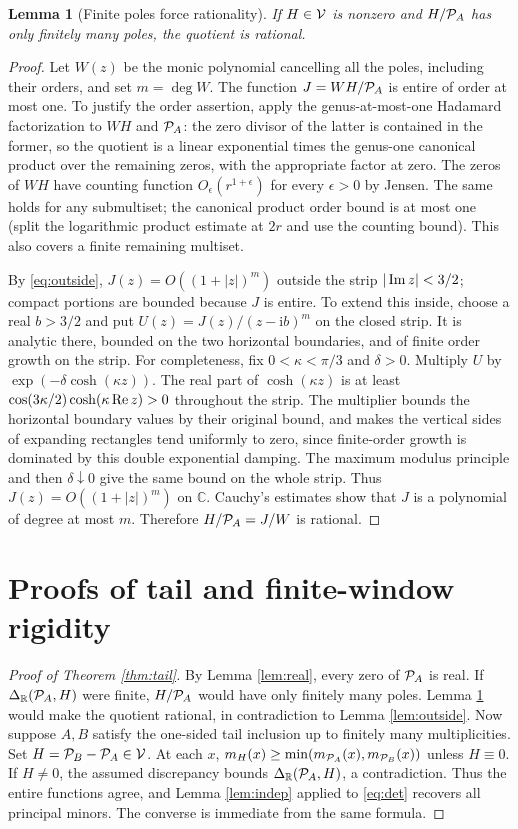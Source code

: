 \documentclass[11pt]{article}
\newtheorem{lemma}[theorem]{Lemma}
\theoremstyle{definition}\newtheorem{definition}[theorem]{Definition}
\newcommand{\C}{\mathbb C}\newcommand{\R}{\mathbb R}\newcommand{\N}{\mathbb N}
\newcommand{\ii}{\mathrm i}\newcommand{\diag}{\operatorname{diag}}
\begin{document}
\begin{lemma}[Finite poles force rationality]\label{lem:rational}
If $H\in\mathcal V$ is nonzero and $H/\mathcal P_A$ has only finitely many poles, the quotient is rational.
\end{lemma}
\begin{proof}
Let $W(z)$ be the monic polynomial cancelling all the poles, including their orders, and set $m=\deg W$. The function $J=W H/\mathcal P_A$ is entire of order at most one. To justify the order assertion, apply the genus-at-most-one Hadamard factorization \cite{boas} to $WH$ and $\mathcal P_A$: the zero divisor of the latter is contained in the former, so the quotient is a linear exponential times the genus-one canonical product over the remaining zeros, with the appropriate factor at zero. The zeros of $WH$ have counting function $O_\epsilon(r^{1+\epsilon})$ for every $\epsilon>0$ by Jensen. The same holds for any submultiset; the canonical product order bound is at most one (split the logarithmic product estimate at $2r$ and use the counting bound). This also covers a finite remaining multiset.

By \eqref{eq:outside}, $J(z)=O((1+|z|)^m)$ outside the strip $|\operatorname{Im} z|<3/2$; compact portions are bounded because $J$ is entire. To extend this inside, choose a real $b>3/2$ and put $U(z)=J(z)/(z-\ii b)^m$ on the closed strip. It is analytic there, bounded on the two horizontal boundaries, and of finite order growth on the strip. For completeness, fix $0<\kappa<\pi/3$ and $\delta>0$. Multiply $U$ by $\exp(-\delta\cosh(\kappa z))$. The real part of $\cosh(\kappa z)$ is at least $\cos(3\kappa/2)\cosh(\kappa\operatorname{Re} z)>0$ throughout the strip. The multiplier bounds the horizontal boundary values by their original bound, and makes the vertical sides of expanding rectangles tend uniformly to zero, since finite-order growth is dominated by this double exponential damping. The maximum modulus principle and then $\delta\downarrow0$ give the same bound on the whole strip. Thus $J(z)=O((1+|z|)^m)$ on $\C$. Cauchy's estimates show that $J$ is a polynomial of degree at most $m$. Therefore $H/\mathcal P_A=J/W$ is rational.
\end{proof}

\section{Proofs of tail and finite-window rigidity}
\begin{proof}[Proof of Theorem \ref{thm:tail}]
By Lemma \ref{lem:real}, every zero of $\mathcal P_A$ is real. If $\Delta_\R(\Pcal_A,H)$ were finite, $H/\mathcal P_A$ would have only finitely many poles. Lemma \ref{lem:rational} would make the quotient rational, in contradiction to Lemma \ref{lem:outside}. Now suppose $A,B$ satisfy the one-sided tail inclusion up to finitely many multiplicities. Set $H=\mathcal P_B-\mathcal P_A\in\mathcal V$. At each $x$, $m_H(x)\ge\min(m_{\mathcal P_A}(x),m_{\mathcal P_B}(x))$ unless $H\equiv0$. If $H\ne0$, the assumed discrepancy bounds $\Delta_\R(\Pcal_A,H)$, a contradiction. Thus the entire functions agree, and Lemma \ref{lem:indep} applied to \eqref{eq:det} recovers all principal minors. The converse is immediate from the same formula.
\end{proof}
\end{document}
